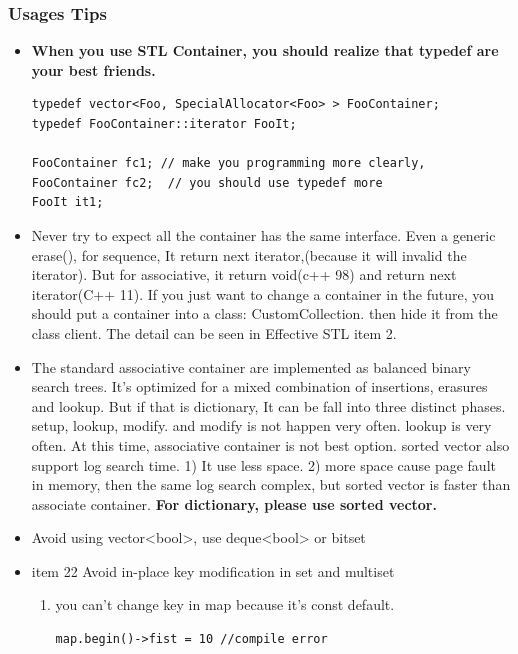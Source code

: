 \documentclass[a4paper,11pt,twoside]{book}
\begin{document}
\subsubsection{Usages Tips}
\begin{itemize}

\item \textbf{When you use STL Container, you should realize that typedef are your best friends.}
\begin{lstlisting}[numbers=none]
typedef vector<Foo, SpecialAllocator<Foo> > FooContainer;
typedef FooContainer::iterator FooIt;

FooContainer fc1; // make you programming more clearly,
FooContainer fc2;  // you should use typedef more
FooIt it1;
\end{lstlisting}


\item Never try to expect all the container has the same interface. Even a generic erase(), for sequence, It return next iterator,(because it will invalid the iterator).   But for associative, it return void(c++ 98) and return next iterator(C++ 11). If you just want to change a container in the future, you should put a container into a class: CustomCollection. then hide it from the class client. The detail can be seen in Effective STL item 2.

\item The standard associative container are implemented as balanced binary search trees.  It's optimized for a mixed combination of insertions, erasures and lookup.  But if that is dictionary, It can be fall into three distinct phases. setup, lookup, modify. and modify is not happen very often. lookup is very often. At this time, associative container is not best option. sorted vector also support log search time.  1) It use less space. 2) more space cause page fault in memory, then the same log search complex, but sorted vector is faster than associate container.\textbf{ For dictionary, please use sorted vector.}


\item Avoid using vector<bool>, use deque<bool> or bitset


\item item 22 Avoid in-place key modification in set and multiset
\begin{enumerate}
   \item you can't change key in map because it's const default.
\begin{lstlisting}[numbers=none]
map.begin()->fist = 10 //compile error
\end{lstlisting}


\end{enumerate}
\end{itemize}
\end{document}
